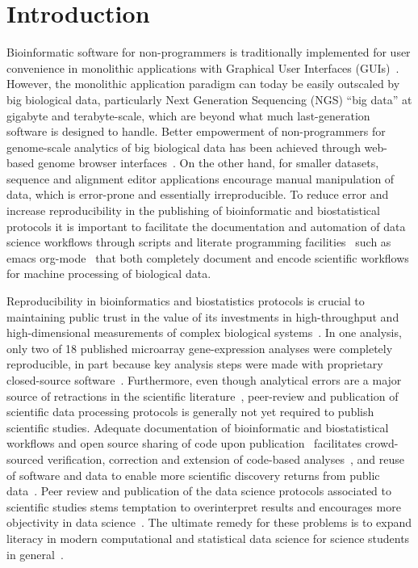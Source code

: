 \documentclass{frontiersSCNS} %
\begin{document}
\section{Introduction}

Bioinformatic software for non-programmers is traditionally
implemented for user convenience in monolithic applications with
Graphical User Interfaces (GUIs)~\citep{Smith1994,stothard_sequence_2000,Rampp2006,
  Librado01062009,waterhouse_jalview_2009,gouy2010seaview}.
However, the monolithic application paradigm can today be easily
outscaled by big biological data, particularly Next Generation
Sequencing (NGS) ``big data'' at gigabyte and terabyte-scale, which
are beyond what much last-generation software is designed to
handle. Better empowerment of non-programmers for genome-scale
analytics of big biological data has been achieved through web-based
genome browser
interfaces~\citep{Cunningham28012015,Rosenbloom28012015,Markowitz01012014}. On
the other hand, for smaller datasets, sequence and alignment editor
applications encourage manual manipulation of data, which is
error-prone and essentially irreproducible. To reduce error and
increase reproducibility in the publishing of bioinformatic and
biostatistical protocols it is important to facilitate the
documentation and automation of data science workflows through scripts
and literate programming facilities~\citep{knuth1984literate} such as
emacs org-mode~\citep{delescluse_making_2012} that both completely
document and encode scientific workflows for machine processing of
biological data.

Reproducibility in bioinformatics and biostatistics protocols is
crucial to maintaining public trust in the value of its investments in
high-throughput and high-dimensional measurements of complex
biological
systems~\citep{BaggerlyCoombes2009,hutson2010data,Baggerly01052011,Huang01072013}.
In one analysis, only two of 18 published microarray gene-expression
analyses were completely reproducible, in part because key analysis
steps were made with proprietary closed-source
software~\citep{Ioannidis:2008cr}. Furthermore, even though analytical
errors are a major source of retractions in the scientific
literature~\citep{Casadevall01092014}, peer-review and publication of
scientific data processing protocols is generally not yet required to
publish scientific studies.  Adequate documentation of bioinformatic
and biostatistical workflows and open source sharing of code upon
publication~\citep{Peng01072009} facilitates crowd-sourced
verification, correction and extension of code-based
analyses~\citep{barnes2010publish,Morin13042012}, and reuse of
software and data to enable more scientific discovery returns from
public data~\citep{Peng02122011}. Peer review and publication of the
data science protocols associated to scientific studies stems
temptation to overinterpret results and encourages more objectivity in
data science~\citep{Boulesteix01022010}. The ultimate remedy for these
problems is to expand literacy in modern computational and statistical
data science for science students in
general~\citep{Morin13042012,Joppa17052013}.
\end{document}
